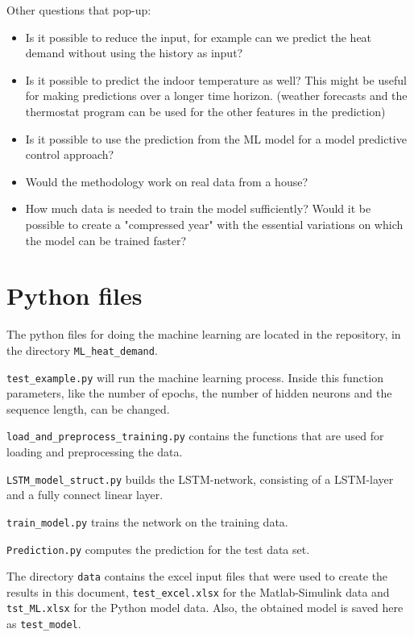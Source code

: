 Other questions that pop-up:
\begin{itemize}
\item Is it possible to reduce the input, for example can we predict the heat demand without using the history as input?
\item Is it possible to predict the indoor temperature as well? This might be useful for making predictions over a longer time horizon. (weather forecasts and the thermostat program can be used for the other features in the prediction)  
\item Is it possible to use the prediction from the ML model for a model predictive control approach?
\item Would the methodology work on real data from a house? 
\item How much data is needed to train the model sufficiently? Would it be possible to create a "compressed year" with the essential variations on which the model can be trained faster? 
\end{itemize}



%
\printbibliography[heading=bibintoc]


\appendix
\section{Python files}
The python files for doing the machine learning are located in the repository, in the directory \texttt{ML\_heat\_demand}. 

\texttt{test\_example.py} will run the machine learning process. Inside this function parameters, like the number of epochs, the number of hidden neurons and the sequence length, can be changed. 

\texttt{load\_and\_preprocess\_training.py} contains the functions that are used for loading and preprocessing the data. 

\texttt{LSTM\_model\_struct.py} builds the LSTM-network, consisting of a LSTM-layer and a fully connect linear layer. 

\texttt{train\_model.py} trains the network on the training data. 

\texttt{Prediction.py} computes the prediction for the test data set. 

The directory \texttt{data} contains the excel input files that were used to create the results in this document, \texttt{test\_excel.xlsx} for the Matlab-Simulink data and \texttt{tst\_ML.xlsx} for the Python model data. Also, the obtained model is saved here as \texttt{test\_model}.






